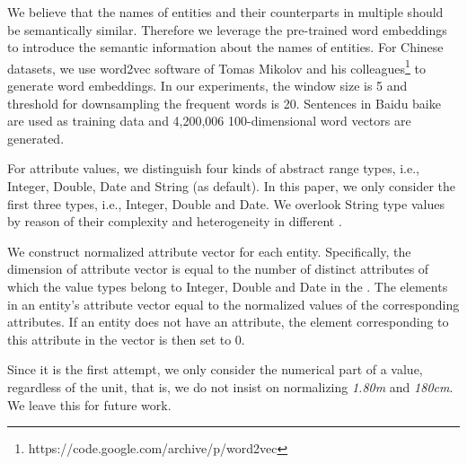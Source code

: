	\label{wordvector}
	We believe that the names of entities and their counterparts in multiple \KGs should be semantically similar. Therefore we leverage the pre-trained word embeddings to introduce the semantic information about the names of entities.
	For Chinese datasets, we use word2vec software of Tomas Mikolov and his colleagues\footnote{https://code.google.com/archive/p/word2vec} to generate word embeddings. In our experiments, the window size is 5 and threshold for downsampling the frequent words is 20. Sentences in Baidu baike are used as training data and 4,200,006 100-dimensional word vectors are generated.
	
	For attribute values, we distinguish four kinds of abstract range types, i.e., Integer, Double, Date and String (as default).
	In this paper, we only consider the first three types, i.e., Integer, Double and Date.
	We overlook String type values by reason of their complexity and heterogeneity in different \KGs.
	
	We construct normalized attribute vector for each entity.
	Specifically, the dimension of attribute vector is equal to the number of distinct attributes of which the value types belong to Integer, Double and Date in the \KG.
	The elements in an entity’s attribute vector equal to the normalized values of the corresponding attributes.
	If an entity does not have an attribute, the element corresponding to this attribute in the vector is then set to 0.
	
	Since it is the first attempt, we only consider the numerical part of a value, regardless of the unit, that is, we do not insist on normalizing \emph{1.80m} and \emph{180cm}.
	We leave this for future work.


